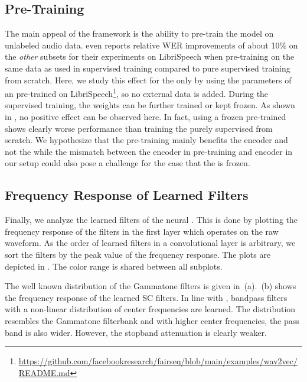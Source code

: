 \documentclass{INTERSPEECH2023}
\begin{document}
\subsection{\wvtwo Pre-Training}
The main appeal of the \wvtwo framework is the ability to pre-train the model on unlabeled audio data.
\cite{facebook2020wav2vec2} even reports relative \gls{WER} improvements of about 10\% on the \textit{other} subsets for their experiments on LibriSpeech when pre-training on the same data as used in supervised training compared to pure supervised training from scratch.
Here, we study this effect for the \fe only by using the parameters of an \fe pre-trained on LibriSpeech\footnote{\raggedright\url{https://github.com/facebookresearch/fairseq/blob/main/examples/wav2vec/README.md}}, so no external data is added.
During the supervised training, the \fe weights can be further trained or kept frozen.
As shown in , no positive effect can be observed here.
In fact, using a frozen pre-trained \fe shows clearly worse performance than training the \fe purely supervised from scratch.
We hypothesize that the pre-training mainly benefits the \transformer encoder and not the \fe while the mismatch between the \transformer encoder in pre-training and \conformer encoder in our setup could also pose a challenge for the case that the \fe is frozen.


\subsection{Frequency Response of Learned Filters}

Finally, we analyze the learned filters of the neural \fes.
This is done by plotting the frequency response of the filters in the first layer which operates on the raw waveform.
As the order of learned filters in a convolutional layer is arbitrary, we sort the filters by the peak value of the frequency response.
The plots are depicted in .
The color range is shared between all subplots.

The well known distribution of the Gammatone filters is given in \,(a).
\,(b) shows the frequency response of the learned \gls{SC} filters.
In line with \cite{tuske2018:waveform}, bandpass filters with a non-linear distribution of center frequencies are learned.
The distribution resembles the Gammatone filterbank and with higher center frequencies, the pass band is also wider.
However, the stopband attenuation is clearly weaker.
\end{document}
